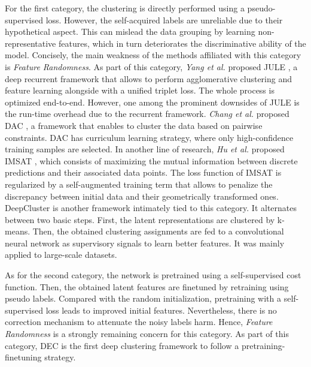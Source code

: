 \documentclass{article}
\begin{document}
For the first category, the clustering is directly performed using a pseudo-supervised loss. However, the self-acquired labels are unreliable due to their hypothetical aspect. This can mislead the data grouping by learning non-representative features, which in turn deteriorates the discriminative ability of the model. Concisely, the main weakness of the methods affiliated with this category is \textit{Feature Randomness}. As part of this category, \textit{Yang et al.} proposed JULE \cite{paper22}, a deep recurrent framework that allows to perform agglomerative clustering and feature learning alongside with a unified triplet loss. The whole process is optimized end-to-end. However, one among the prominent downsides of JULE is the run-time overhead due to the recurrent framework. \textit{Chang et al.} proposed DAC \cite{paper23}, a framework that enables to cluster the data based on pairwise constraints. DAC has curriculum learning strategy, where only high-confidence training samples are selected. In another line of research, \textit{Hu et al.} proposed IMSAT \cite{paper26}, which consists of maximizing the mutual information between discrete predictions and their associated data points. The loss function of IMSAT is regularized by a self-augmented training term that allows to penalize the discrepancy between initial data and their geometrically transformed ones. DeepCluster \cite{paper24} is another framework intimately tied to this category. It alternates between two basic steps. First, the latent representations are clustered by k-means. Then, the obtained clustering assignments are fed to a convolutional neural network as supervisory signals to learn better features. It was mainly applied to large-scale datasets.

As for the second category, the network is pretrained using a self-supervised cost function. Then, the obtained latent features are finetuned by retraining using pseudo labels. Compared with the random initialization, pretraining with a self-supervised loss leads to improved initial features. Nevertheless, there is no correction mechanism to attenuate the noisy labels harm. Hence, \textit{Feature Randomness} is a strongly remaining concern for this category. As part of this category, DEC \cite{paper27} is the first deep clustering framework to follow a pretraining-finetuning strategy.
\end{document}
